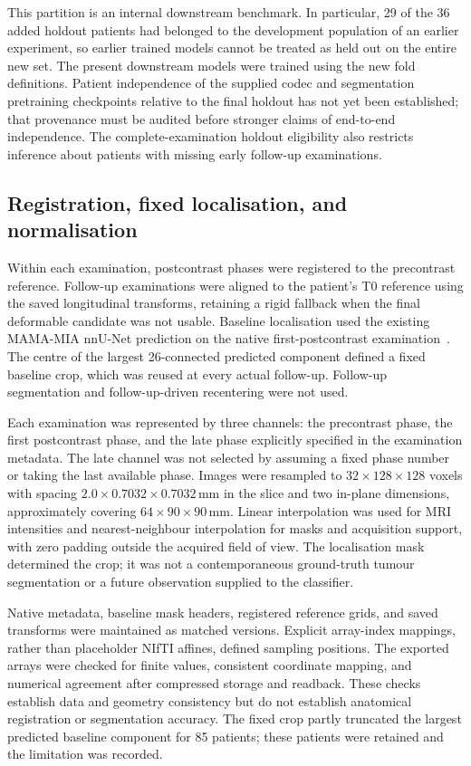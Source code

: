 This partition is an internal downstream benchmark. In particular, 29 of the
36 added holdout patients had belonged to the development population of an
earlier experiment, so earlier trained models cannot be treated as held out
on the entire new set. The present downstream models were trained using the
new fold definitions. Patient independence of the supplied codec and
segmentation pretraining checkpoints relative to the final holdout has not
yet been established; that provenance must be audited before stronger claims
of end-to-end independence. The complete-examination holdout eligibility also
restricts inference about patients with missing early follow-up examinations.

\subsection{Registration, fixed localisation, and normalisation}
Within each examination, postcontrast phases were registered to the
precontrast reference. Follow-up examinations were aligned to the patient's
T0 reference using the saved longitudinal transforms, retaining a rigid
fallback when the final deformable candidate was not usable. Baseline
localisation used the existing MAMA-MIA nnU-Net prediction on the native
first-postcontrast examination~\cite{mamamia2025}. The centre of the largest
26-connected predicted component defined a fixed baseline crop, which was
reused at every actual follow-up. Follow-up segmentation and follow-up-driven
recentering were not used.

Each examination was represented by three channels: the precontrast phase,
the first postcontrast phase, and the late phase explicitly specified in the
examination metadata. The late channel was not selected by assuming a fixed
phase number or taking the last available phase. Images were resampled to
$32\times128\times128$ voxels with spacing
$2.0\times0.7032\times0.7032\,\mathrm{mm}$ in the slice and two in-plane
dimensions, approximately covering $64\times90\times90\,\mathrm{mm}$.
Linear interpolation was used for MRI intensities and nearest-neighbour
interpolation for masks and acquisition support, with zero padding outside
the acquired field of view. The localisation mask determined the crop; it was
not a contemporaneous ground-truth tumour segmentation or a future
observation supplied to the classifier.

Native metadata, baseline mask headers, registered reference grids, and saved
transforms were maintained as matched versions. Explicit array-index
mappings, rather than placeholder NIfTI affines, defined sampling positions.
The exported arrays were checked for finite values, consistent coordinate
mapping, and numerical agreement after compressed storage and readback.
These checks establish data and geometry consistency but do not establish
anatomical registration or segmentation accuracy. The fixed crop partly
truncated the largest predicted baseline component for 85 patients; these
patients were retained and the limitation was recorded.

